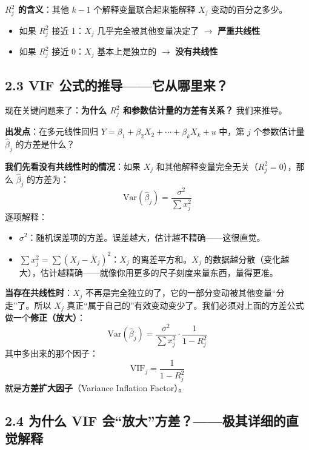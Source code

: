 \documentclass[12pt,a4paper]{ctexart}
\begin{document}
\textbf{$R_j^2$ 的含义}：其他 $k-1$ 个解释变量联合起来能解释 $X_j$ 变动的百分之多少。
\begin{itemize}
  \item 如果 $R_j^2$ 接近 1：$X_j$ 几乎完全被其他变量决定了 $\rightarrow$ \textbf{严重共线性}
  \item 如果 $R_j^2$ 接近 0：$X_j$ 基本上是独立的 $\rightarrow$ \textbf{没有共线性}
\end{itemize}

\subsection*{2.3 VIF 公式的推导——它从哪里来？}

现在关键问题来了：\textbf{为什么 $R_j^2$ 和参数估计量的方差有关系？} 我们来推导。

\textbf{出发点}：在多元线性回归 $Y = \beta_1 + \beta_2 X_2 + \cdots + \beta_k X_k + u$ 中，第 $j$ 个参数估计量 $\hat{\beta}_j$ 的方差是什么？

\textbf{我们先看没有共线性时的情况}：如果 $X_j$ 和其他解释变量完全无关（$R_j^2 = 0$），那么 $\hat{\beta}_j$ 的方差为：
\[
\text{Var}(\hat{\beta}_j) = \frac{\sigma^2}{\sum x_j^2}
\]
逐项解释：
\begin{itemize}
  \item $\sigma^2$：随机误差项的方差。误差越大，估计越不精确——这很直觉。
  \item $\sum x_j^2 = \sum (X_j - \bar{X}_j)^2$：$X_j$ 的离差平方和。$X_j$ 的数据越分散（变化越大），估计越精确——就像你用更多的尺子刻度来量东西，量得更准。
\end{itemize}

\textbf{当存在共线性时}：$X_j$ 不再是完全独立的了，它的一部分变动被其他变量“分走”了。所以 $X_j$ 真正“属于自己的”有效变动变少了。我们必须对上面的方差公式做一个\textbf{修正（放大）}：
\begin{equation}
\text{Var}(\hat{\beta}_j) = \frac{\sigma^2}{\sum x_j^2} \cdot \frac{1}{1 - R_j^2} \tag{4.20}
\end{equation}
其中多出来的那个因子：
\begin{equation}
\text{VIF}_j = \frac{1}{1 - R_j^2} \tag{4.21}
\end{equation}
就是\textbf{方差扩大因子}（Variance Inflation Factor）。

\subsection*{2.4 为什么 VIF 会“放大”方差？——极其详细的直觉解释}
\end{document}
